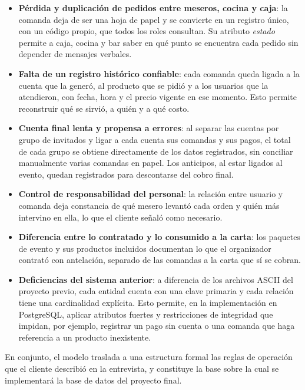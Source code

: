 \begin{itemize}
    \item \textbf{Pérdida y duplicación de pedidos entre meseros, cocina y caja}: la comanda deja de ser una hoja de papel y se convierte en un registro único, con un código propio, que todos los roles consultan. Su atributo \emph{estado} permite a caja, cocina y bar saber en qué punto se encuentra cada pedido sin depender de mensajes verbales.

    \item \textbf{Falta de un registro histórico confiable}: cada comanda queda ligada a la cuenta que la generó, al producto que se pidió y a los usuarios que la atendieron, con fecha, hora y el precio vigente en ese momento. Esto permite reconstruir qué se sirvió, a quién y a qué costo.

    \item \textbf{Cuenta final lenta y propensa a errores}: al separar las cuentas por grupo de invitados y ligar a cada cuenta sus comandas y sus pagos, el total de cada grupo se obtiene directamente de los datos registrados, sin conciliar manualmente varias comandas en papel. Los anticipos, al estar ligados al evento, quedan registrados para descontarse del cobro final.

    \item \textbf{Control de responsabilidad del personal}: la relación entre usuario y comanda deja constancia de qué mesero levantó cada orden y quién más intervino en ella, lo que el cliente señaló como necesario.

    \item \textbf{Diferencia entre lo contratado y lo consumido a la carta}: los paquetes de evento y sus productos incluidos documentan lo que el organizador contrató con antelación, separado de las comandas a la carta que sí se cobran.

    \item \textbf{Deficiencias del sistema anterior}: a diferencia de los archivos ASCII del proyecto previo, cada entidad cuenta con una clave primaria y cada relación tiene una cardinalidad explícita. Esto permite, en la implementación en PostgreSQL, aplicar atributos fuertes y restricciones de integridad que impidan, por ejemplo, registrar un pago sin cuenta o una comanda que haga referencia a un producto inexistente.
\end{itemize}

En conjunto, el modelo traslada a una estructura formal las reglas de operación que el cliente describió en la entrevista, y constituye la base sobre la cual se implementará la base de datos del proyecto final.

